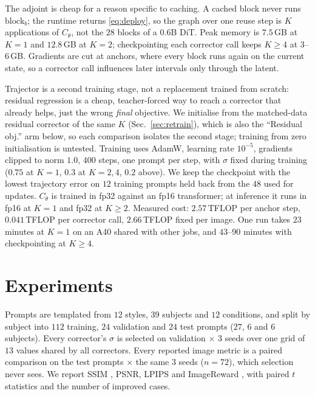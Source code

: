 \documentclass[conference,compsoc]{IEEEtran}
\newcommand{\ourmethod}{Trajector}
\begin{document}
The adjoint is cheap for a reason specific to caching. A cached block never
runs $\mathrm{block}_b$; the runtime returns \eqref{eq:deploy}, so the
graph over one reuse step is $K$ applications of $C_\theta$, not the $28$ blocks of a $0.6$B DiT. Peak memory is $7.5$\,GB at $K{=}1$ and $12.8$\,GB at
$K{=}2$; checkpointing each corrector call keeps $K{\ge}4$ at $3$--$6$\,GB. Gradients
are cut at anchors, where every block runs again on the current state, so a corrector call influences later intervals only through the latent.

\ourmethod{} is a second training stage, not a replacement trained from scratch:
residual regression is a cheap, teacher-forced way to reach a corrector that
already helps, just the wrong \emph{final} objective. We initialise from the
matched-data residual corrector of the same $K$ (Sec.~\ref{sec:retrain}), which
is also the ``Residual obj.'' arm below, so each comparison isolates the second
stage; training from zero initialisation is untested.
Training uses AdamW, learning rate $10^{-5}$, gradients clipped to norm $1.0$,
$400$ steps, one prompt per step, with $\sigma$ fixed during training ($0.75$ at $K{=}1$, $0.3$ at $K{=}2,4$, $0.2$ above). We keep the checkpoint with the lowest trajectory error on $12$ training prompts held back from the $48$ used for updates. $C_\theta$ is trained in fp32 against an fp16 transformer; at inference it runs in fp16 at $K{=}1$ and fp32 at $K{\ge}2$. Measured cost: $2.57$\,TFLOP per anchor step, $0.041$\,TFLOP per corrector call, $2.66$\,TFLOP fixed per image. One run
takes $23$ minutes at $K{=}1$ on an A40 shared with other jobs, and
$43$--$90$ minutes with checkpointing at $K{\ge}4$.

\section{Experiments}
\label{sec:experiments}

Prompts are templated from $12$ styles, $39$ subjects and $12$ conditions,
and split by subject into $112$ training, $24$ validation and $24$ test
prompts ($27$, $6$ and $6$ subjects). Every
corrector's $\sigma$ is selected on validation $\times$ $3$ seeds over one
grid of $13$ values shared by all correctors. Every reported image metric is
a paired comparison on the test prompts $\times$ the same $3$ seeds
($n{=}72$), which selection never sees. We report SSIM \cite{wang2004ssim},
PSNR, LPIPS \cite{zhang2018lpips} and ImageReward \cite{xu2023imagereward},
with paired $t$ statistics and the number of improved cases.
\end{document}

